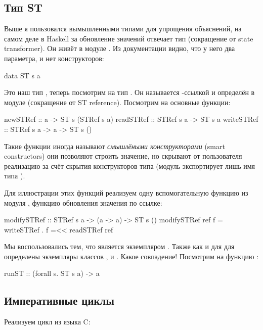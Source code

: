 \subsection{Тип ST}

Выше я пользовался вымышленными типами для упрощения объяснений, на
самом деле в Haskell за обновление значений отвечает тип 
(сокращение от state transformer). Он живёт в модуле
. Из документации видно, что у него два параметра,
и нет конструкторов:


\begin{code}
data ST s a
\end{code}

Это наш тип , теперь посмотрим на тип . Он
называется -ссылкой и определён в модуле 
(сокращение от ST reference). Посмотрим на основные функции:


\begin{code}
newSTRef    :: a -> ST s (STRef s a)
readSTRef   :: STRef s a -> ST s a
writeSTRef  :: STRef s a -> a -> ST s ()
\end{code}

Такие функции иногда называют \emph{смышлёными конструкторами} (smart
constructors) они позволяют строить значение, но скрывают от
пользователя реализацию за счёт скрытия конструкторов типа (модуль
экспортирует лишь имя типа ).

Для иллюстрации этих функций реализуем одну вспомогательную функцию из
модуля , функцию обновления значения по ссылке:


\begin{code}
modifySTRef :: STRef s a -> (a -> a) -> ST s ()
modifySTRef ref f = writeSTRef . f =<< readSTRef ref 
\end{code}

Мы воспользовались тем, что  является экземпляром .
Также как и для  для  определены экземпляры классов
,  и . Какое совпадение! Посмотрим
на функцию :


\begin{code}
runST :: (forall s. ST s a) -> a
\end{code}

\subsection{Императивные циклы}

Реализуем  цикл из языка C:

